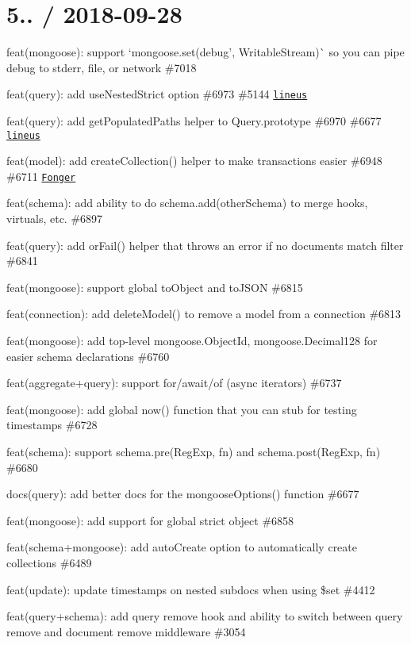 \section*{5.. / 2018-\/09-\/28 }


\begin{DoxyItemize}
\item feat(mongoose)\+: support `mongoose.\+set(\textquotesingle{}debug', Writable\+Stream)\`{} so you can pipe debug to stderr, file, or network \#7018
\item feat(query)\+: add use\+Nested\+Strict option \#6973 \#5144 \href{https://github.com/lineus}{\tt lineus}
\item feat(query)\+: add get\+Populated\+Paths helper to Query.\+prototype \#6970 \#6677 \href{https://github.com/lineus}{\tt lineus}
\item feat(model)\+: add {\ttfamily create\+Collection()} helper to make transactions easier \#6948 \#6711 \href{https://github.com/Fonger}{\tt Fonger}
\item feat(schema)\+: add ability to do {\ttfamily schema.\+add(other\+Schema)} to merge hooks, virtuals, etc. \#6897
\item feat(query)\+: add {\ttfamily or\+Fail()} helper that throws an error if no documents match {\ttfamily filter} \#6841
\item feat(mongoose)\+: support global to\+Object and to\+J\+S\+ON \#6815
\item feat(connection)\+: add delete\+Model() to remove a model from a connection \#6813
\item feat(mongoose)\+: add top-\/level mongoose.\+Object\+Id, mongoose.\+Decimal128 for easier schema declarations \#6760
\item feat(aggregate+query)\+: support for/await/of (async iterators) \#6737
\item feat(mongoose)\+: add global {\ttfamily now()} function that you can stub for testing timestamps \#6728
\item feat(schema)\+: support {\ttfamily schema.\+pre(\+Reg\+Exp, fn)} and {\ttfamily schema.\+post(\+Reg\+Exp, fn)} \#6680
\item docs(query)\+: add better docs for the {\ttfamily mongoose\+Options()} function \#6677
\item feat(mongoose)\+: add support for global strict object \#6858
\item feat(schema+mongoose)\+: add auto\+Create option to automatically create collections \#6489
\item feat(update)\+: update timestamps on nested subdocs when using {\ttfamily \$set} \#4412
\item feat(query+schema)\+: add query {\ttfamily remove} hook and ability to switch between query {\ttfamily remove} and document {\ttfamily remove} middleware \#3054
\end{DoxyItemize}

